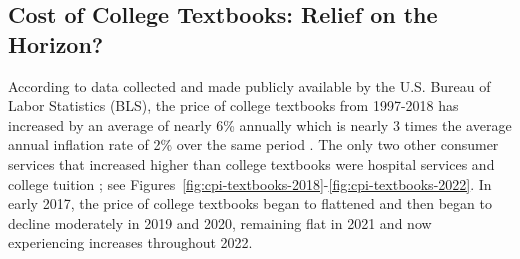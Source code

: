 \documentclass[11pt]{article}
\begin{document}
\subsection{Cost of College Textbooks: Relief on the Horizon?}
According to data collected and made publicly available by the U.S. Bureau of Labor Statistics (BLS), the price of college textbooks from 1997-2018 has increased by an average of nearly 6\% annually which is nearly 3 times the average annual inflation rate of 2\% over the same period \cite{bls}. The only two other consumer services that increased higher than college textbooks were hospital services and college tuition \cite{perry2018, perry2022}; see Figures~\ref{fig:cpi-textbooks-2018}-\ref{fig:cpi-textbooks-2022}.  In early 2017, the price of college textbooks began to flattened and then began to decline moderately in 2019 and 2020, remaining flat in 2021 and now experiencing increases throughout 2022.
\end{document}
